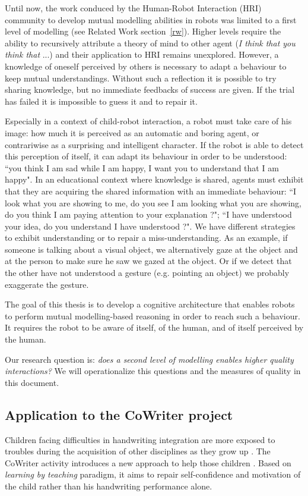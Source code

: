 \documentclass[10pt,a4paper]{article}
\begin{document}
Until now, the work conduced by the Human-Robot Interaction (HRI) community to develop mutual modelling abilities in robots was limited to a first level of modelling (see Related Work section~\ref{rw}). Higher levels require the ability to recursively attribute a theory of mind to other agent (\textit{I think that you think that} ...) and their application to HRI remains unexplored. However, a knowledge of oneself perceived by others is necessary to adapt a behaviour to keep mutual understandings. Without such a reflection it is possible to try sharing knowledge, but no immediate feedbacks of success are given. If the trial has failed it is impossible to guess it and to repair it. %

Especially in a context of child-robot interaction, a robot must take care of his image: how much it is perceived as an automatic and boring agent, or contrariwise as a surprising and intelligent character. If the robot is able to detect this perception of itself, it can adapt its behaviour in order to be understood: ``you think I am sad while I am happy, I want you to understand that I am happy". In an educational context where knowledge is shared, agents must exhibit that they are acquiring the shared information with an immediate behaviour: ``I look what you are showing to me, do you see I am looking what you are showing, do you think I am paying attention to your explanation ?"; ``I have understood your idea, do you understand I have understood ?". We have different strategies to exhibit understanding or to repair a miss-understanding. As an example, if someone is talking about a visual object, we alternatively gaze at the object and at the person to make sure he saw we gazed at the object. Or if we detect that the other have not understood a gesture (e.g. pointing an object) we probably exaggerate the gesture.

The goal of this thesis is to develop a cognitive architecture that enables robots to perform mutual modelling-based reasoning in order to reach such a behaviour. It requires the robot to be aware of itself, of the human, and of itself perceived by the human. 

Our research question is: \textit{does a second level of modelling enables higher quality interactions?} We will operationalize this questions and the measures of quality in this document.

\subsection{Application to the CoWriter project}
Children facing difficulties in handwriting integration are more exposed
to troubles during the acquisition of other disciplines as they grow up
\cite{Christensen2005}. 
The CoWriter activity introduces a new approach to help those children
\cite{Hood}. Based on \emph{learning by teaching} paradigm, it aims to repair self-confidence and motivation of the child rather than his handwriting performance alone.
\end{document}
